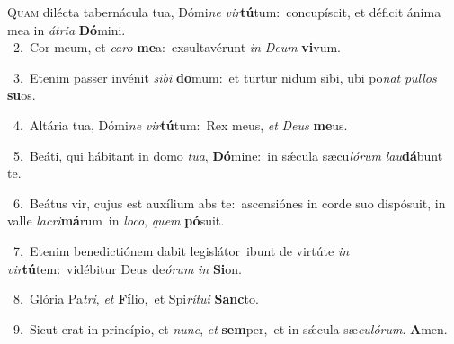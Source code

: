 \lettrine{\initial\textcolor{\initialcolor}{Q}}{uam} dilécta tabernácula tua, Dómi\textit{ne} \textit{vir}\-\textbf{tú}tum:~\star concupíscit, et déficit ánima mea in \textit{á}\-\textit{tri}\textit{a} \textbf{Dó}\-mini.\\
{\numbfont\textcolor{\numbcolor}{~2.}}~Cor meum, et \textit{ca}\-\textit{ro} \textbf{me}\-a:~\star exsultavérunt \textit{in} \textit{De}\-\textit{um} \textbf{vi}\-vum.\par
{\numbfont\textcolor{\numbcolor}{~3.}}~Etenim passer invénit \textit{si}\-\textit{bi} \textbf{do}\-mum:~\star et turtur nidum sibi, ubi po\textit{nat} \textit{pul}\-\textit{los} \textbf{su}\-os.\par
{\numbfont\textcolor{\numbcolor}{~4.}}~Altária tua, Dómi\textit{ne} \textit{vir}\-\textbf{tú}tum:~\star Rex meus, \textit{et} \textit{De}\-\textit{us} \textbf{me}\-us.\par
{\numbfont\textcolor{\numbcolor}{~5.}}~Beáti, qui hábitant in domo \textit{tu}\-\textit{a}, \textbf{Dó}\-mine:~\star in sǽcula sæcu\-\textit{ló}\-\textit{rum} \textit{lau}\-\textbf{dá}bunt te.\par
{\numbfont\textcolor{\numbcolor}{~6.}}~Beátus vir, cujus est auxílium abs te:~\dagger ascensiónes in corde suo dispósuit, in valle \textit{la}\-\textit{cri}\textbf{má}rum~\star in \textit{lo}\-\textit{co}, \textit{quem} \textbf{pó}\-suit.\par
{\numbfont\textcolor{\numbcolor}{~7.}}~Etenim benedictiónem dabit legislátor~\dagger ibunt de virtúte \textit{in} \textit{vir}\-\textbf{tú}tem:~\star vidébitur Deus de\-\textit{ó}\-\textit{rum} \textit{in} \textbf{Si}\-on.\par
{\numbfont\textcolor{\numbcolor}{~8.}}~Glória Pa\-\textit{tri}\-, \textit{et} \textbf{Fí}\-lio,~\star et Spi\-\textit{rí}\-\textit{tu}\textit{i} \textbf{Sanc}\-to.\par
{\numbfont\textcolor{\numbcolor}{~9.}}~Sicut erat in princípio, et \textit{nunc}\-, \textit{et} \textbf{sem}\-per,~\star et in sǽcula sæ\-\textit{cu}\-\textit{ló}\textit{rum}. \textbf{A}\-men.\par
